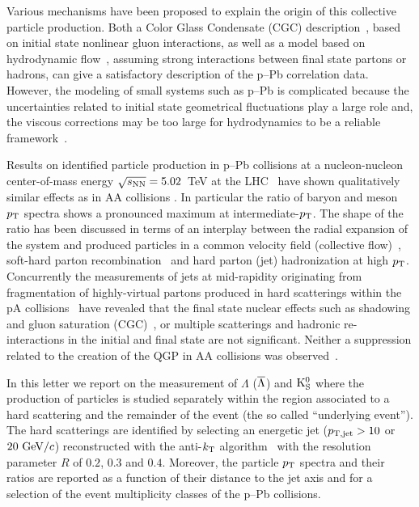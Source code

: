 Various mechanisms have been proposed to explain the origin of this collective particle production.
Both a Color Glass Condensate (CGC) description~\cite{Dusling:2013oia}, based on initial state nonlinear gluon interactions, as well as a model based on hydrodynamic flow~\cite{Bozek:2012gr,Qin:2013bha}, assuming strong interactions between final state partons or hadrons, can give a satisfactory
description of the p--Pb correlation data.
However, the modeling of small systems such as p--Pb is complicated because the uncertainties related to initial state geometrical fluctuations play a large role and, the viscous corrections may be too large for hydrodynamics to be a reliable framework~\cite{Bzdak:2013zma}.

Results on identified particle production in p--Pb collisions at a nucleon-nucleon center-of-mass energy $\sqrt{s_{\rm NN}}=5.02$~TeV at the LHC~\cite{Abelev:2013haa} have shown qualitatively similar effects as in AA collisions \cite{Abelev:2013xaa,ABELEV:2013wsa}.
In particular the ratio of baryon and meson $\pT$ spectra shows a pronounced maximum at intermediate-$\pT$.
The shape of the ratio has been discussed in terms of an interplay between the radial expansion of the system and produced particles in a common velocity field (collective flow)~\cite{Schnedermann:1993ws}, soft-hard parton recombination~\cite{Fries:2003vb} and hard parton (jet) hadronization at high $\pT$.
Concurrently the measurements of jets at mid-rapidity originating from fragmentation of highly-virtual partons produced in hard scatterings within the pA collisions~\cite{Adam:2015hoa,Adam:2015xea} have revealed that the final state nuclear effects such as shadowing and gluon saturation (CGC)~\cite{McLerran:2001sr,Salgado:2011wc}, or multiple scatterings and hadronic re-interactions in the initial and final state \cite{Krzywicki:1979gv,Accardi:2007in} are not significant.
Neither a suppression related to the creation of the QGP in AA collisions was observed~\cite{Aad:2010bu,Chatrchyan:2012nia,Aad:2012vca,Abelev:2013kqa,Aad:2014bxa}.

In this letter we report on the measurement of $\Lambda$ ($\overline{\Lambda}$) and ${\rm K}_{\rm S}^{0}$ where the production of particles is studied separately within the region associated to a hard scattering and the remainder of the event (the so called ``underlying event'').
The hard scatterings are identified by selecting an energetic jet ($\pT[jet]>10$ or $20~{\rm GeV/}c$) reconstructed with the anti-$k_{\rm T}$ algorithm~\cite{Cacciari:2008gp} with the resolution parameter $R$ of $0.2$, $0.3$ and $0.4$.
Moreover, the particle $\pT$ spectra and their ratios are reported as a function of their distance to the jet axis and for a selection of the event multiplicity classes of the p--Pb collisions.
